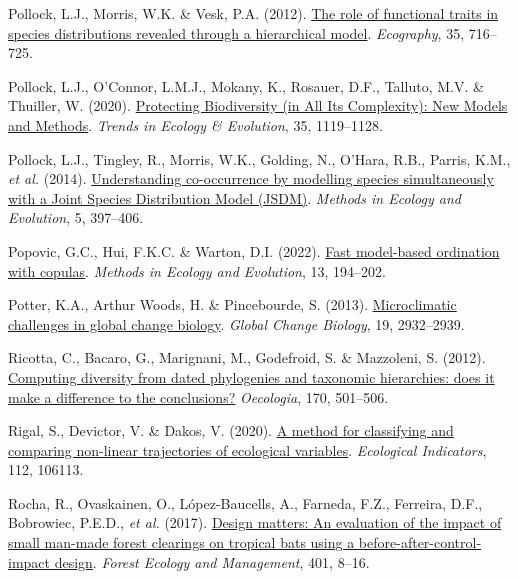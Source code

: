 \documentclass[9pt,biorxiv,doublespacing,lineno]{lapreprint}
\newlength{\cslhangindent}
\newlength{\cslentryspacingunit} %
\newenvironment{CSLReferences}[2] %
 {%
  \setlength{\parindent}{0pt}
  \ifodd #1
  \let\oldpar\par
  \def\par{\hangindent=\cslhangindent\oldpar}
  \fi
  \setlength{\parskip}{#2\cslentryspacingunit}
 }%
 {}
\begin{document}
\begin{CSLReferences}{1}{0}
\leavevmode{}%
Pollock, L.J., Morris, W.K. \& Vesk, P.A. (2012).
\href{https://doi.org/10.1111/j.1600-0587.2011.07085.x}{The role of
functional traits in species distributions revealed through a
hierarchical model}. \emph{Ecography}, 35, 716--725.

\leavevmode{}%
Pollock, L.J., O'Connor, L.M.J., Mokany, K., Rosauer, D.F., Talluto,
M.V. \& Thuiller, W. (2020).
\href{https://doi.org/10.1016/j.tree.2020.08.015}{Protecting
Biodiversity (in All Its Complexity): New Models and Methods}.
\emph{Trends in Ecology \& Evolution}, 35, 1119--1128.

\leavevmode{}%
Pollock, L.J., Tingley, R., Morris, W.K., Golding, N., O'Hara, R.B.,
Parris, K.M., \emph{et al.} (2014).
\href{https://doi.org/10.1111/2041-210X.12180}{Understanding
co-occurrence by modelling species simultaneously with a Joint Species
Distribution Model (JSDM)}. \emph{Methods in Ecology and Evolution}, 5,
397--406.

\leavevmode{}%
Popovic, G.C., Hui, F.K.C. \& Warton, D.I. (2022).
\href{https://doi.org/10.1111/2041-210X.13733}{Fast model-based
ordination with copulas}. \emph{Methods in Ecology and Evolution}, 13,
194--202.

\leavevmode{}%
Potter, K.A., Arthur Woods, H. \& Pincebourde, S. (2013).
\href{https://doi.org/10.1111/gcb.12257}{Microclimatic challenges in
global change biology}. \emph{Global Change Biology}, 19, 2932--2939.

\leavevmode{}%
Ricotta, C., Bacaro, G., Marignani, M., Godefroid, S. \& Mazzoleni, S.
(2012). \href{https://doi.org/10.1007/s00442-012-2318-8}{Computing
diversity from dated phylogenies and taxonomic hierarchies: does it make
a difference to the conclusions?} \emph{Oecologia}, 170, 501--506.

\leavevmode{}%
Rigal, S., Devictor, V. \& Dakos, V. (2020).
\href{https://doi.org/10.1016/j.ecolind.2020.106113}{A method for
classifying and comparing non-linear trajectories of ecological
variables}. \emph{Ecological Indicators}, 112, 106113.

\leavevmode{}%
Rocha, R., Ovaskainen, O., López-Baucells, A., Farneda, F.Z., Ferreira,
D.F., Bobrowiec, P.E.D., \emph{et al.} (2017).
\href{https://doi.org/10.1016/j.foreco.2017.06.053}{Design matters: An
evaluation of the impact of small man-made forest clearings on tropical
bats using a before-after-control-impact design}. \emph{Forest Ecology
and Management}, 401, 8--16.


\end{CSLReferences}
\end{document}
